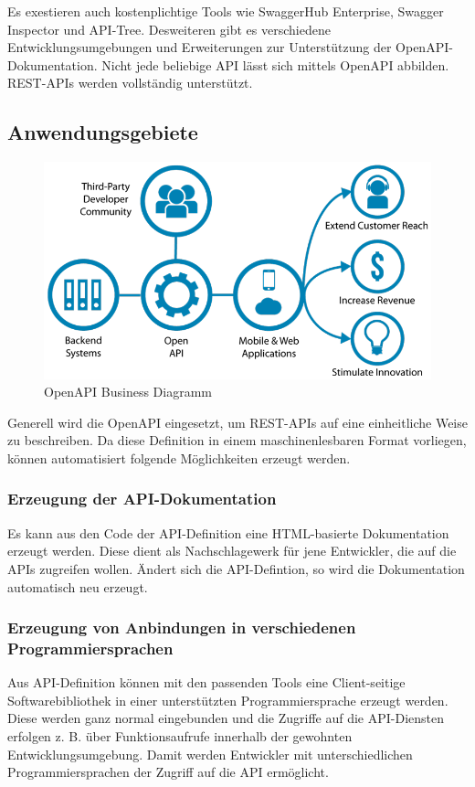 Es exestieren auch kostenplichtige Tools wie SwaggerHub Enterprise, Swagger Inspector und API-Tree. 
Desweiteren gibt es verschiedene Entwicklungsumgebungen und Erweiterungen zur Unterstützung der OpenAPI-Dokumentation. 
Nicht jede beliebige API lässt sich mittels OpenAPI abbilden. REST-APIs werden vollständig unterstützt.

\subsection{Anwendungsgebiete}
\begin{figure}[h]
    \begin{center}
        \includegraphics*[width=14cm]{./pics/Open-APIs-v5.png}
        \caption[OpenAPI Business Diagramm]{OpenAPI Business Diagramm \cite{OpenAPIBusinessChart}}
    \end{center}
\end{figure}

Generell wird die OpenAPI eingesetzt, um REST-APIs auf eine einheitliche Weise zu beschreiben. Da diese Definition in einem 
maschinenlesbaren Format vorliegen, können automatisiert folgende Möglichkeiten erzeugt werden.

\subsubsection{Erzeugung der API-Dokumentation}
Es kann aus den Code der API-Definition eine HTML-basierte Dokumentation erzeugt werden. Diese dient als Nachschlagewerk für jene Entwickler, 
die auf die APIs zugreifen wollen. Ändert sich die API-Defintion, so wird die Dokumentation automatisch neu erzeugt.

\subsubsection{Erzeugung von Anbindungen in verschiedenen Programmiersprachen}
Aus API-Definition können mit den passenden Tools eine Client-seitige Softwarebibliothek in einer unterstützten Programmiersprache 
erzeugt werden. Diese werden ganz normal eingebunden und die Zugriffe auf die API-Diensten erfolgen z. B. über Funktionsaufrufe innerhalb 
der gewohnten Entwicklungsumgebung. Damit werden Entwickler mit unterschiedlichen Programmiersprachen der Zugriff auf die API ermöglicht.


